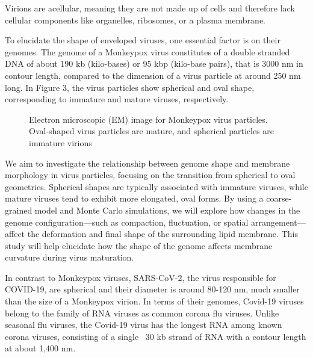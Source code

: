 \documentclass[12pt]{article}
\begin{document}
\begin{flushleft}
Virions are acellular, meaning they are not made up of cells and therefore lack cellular components like organelles, ribosomes, or a plasma membrane. 

To elucidate the shape of enveloped viruses, one essential factor is on their genomes. The genome of a Monkeypox virus constitutes of a double stranded DNA of about 190 kb (kilo-bases) or 95 kbp (kilo-base pairs), that is 3000 nm in contour length, compared to the dimension of a virus particle at around 250 nm long\cite{erez2019diagnosis}\cite{parker2007human}. In Figure 3, the virus particles show spherical and oval shape, corresponding to immature and mature viruses, respectively.

\begin{figure}[!ht]
  \centering  
  \caption{Electron microscopic (EM) image for
Monkeypox virus particles. Oval-shaped
virus particles are mature, and spherical
particles are immature virions \cite{goldsmith2003monkeypox}}
\end{figure}

We aim to investigate the relationship between genome shape and membrane morphology in virus particles, focusing on the transition from spherical to oval geometries. Spherical shapes are typically associated with immature viruses, while mature viruses tend to exhibit more elongated, oval forms. By using a coarse-grained model and Monte Carlo simulations, we will explore how changes in the genome configuration—such as compaction, fluctuation, or spatial arrangement—affect the deformation and final shape of the surrounding lipid membrane. This study will help elucidate how the shape of the genome affects membrane curvature during virus maturation.




In contrast to Monkeypox viruses, SARS-CoV-2, the virus responsible for COVID-19, are spherical and their diameter is around 80-120 nm, much smaller than the size of a Monkeypox virion. In terms of
their genomes, Covid-19 viruses belong to the family of
RNA viruses as common corona flu viruses. Unlike
seasonal flu viruses, the Covid-19 virus has the longest
RNA among known corona viruses, consisting of a single
~30 kb strand of RNA with a contour length at about
1,400 nm. \cite{baron2020sars}\cite{Wu2022}



\end{flushleft}
\end{document}
